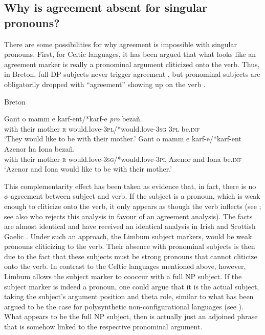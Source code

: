 \documentclass[output=paper]{langscibook}
\begin{document}
\subsection{Why is agreement absent for singular pronouns?}

There are some possibilities for why agreement is impossible with
singular pronouns.  First, for Celtic languages, it has been
argued that what looks like an agreement marker is really a pronominal
argument cliticized onto the verb. Thus, in Breton, full DP subjects
never trigger agreement , but pronominal subjects are
obligatorily dropped with ``agreement'' showing up on the verb
.

\ea Breton \citep[][1916]{jouitteau+rezac06}
\begin{xlist}
\ex \label{ex:johanneshein:bretona}
\gll Gant o mamm e karf-ent/*karf-e \textit{pro} beza\~n.\\
with their mother \textsc{r} would.love-\textsc{3pl}/*would.love-\textsc{3sg} \textsc{3pl} be.\textsc{inf}\\
\glt `They would like to be with their mother.'
\ex \label{ex:johanneshein:bretonb}
\gll Gant o mamm e karf-e/*karf-ent Azenor ha Iona beza\~n.\\
with their mother \textsc{r} would.love-\textsc{3sg}/*would.love-\textsc{3pl} Azenor and Iona be.\textsc{inf}\\
\glt `Azenor and Iona would like to be with their mother.'
\end{xlist}
\z
This complementarity effect has been taken as evidence that, in fact,
there is no $\phi$-agreement between subject and verb. If the subject
is a pronoun, which is weak enough to cliticize onto the verb, it only
appears as though the verb inflects (see \citealp{anderson82}; see
also \citealp{stump84} who rejects this analysis in favour of an
agreement analysis). The facts are almost identical and have received
an identical analysis in Irish
\citep{pranka83,doron88,ackema+neeleman03} and Scottish Gaelic
\citep{adger00}. Under such an approach, the Limbum subject markers,
would be weak pronouns cliticizing to the verb. Their absence with
pronominal subjects is then due to the fact that these subjects must
be strong pronouns that cannot cliticize onto the verb. In contrast to
the Celtic languages mentioned above, however, Limbum allows the
subject marker to cooccur with a full NP subject. If the subject
marker is indeed a pronoun, one could argue that it is the actual
subject, taking the subject's argument position and theta role,
similar to what has been argued to be the case for polysynthetic
non-configurational languages (see \citealp{jelinek84,baker96}). What
appears to be the full NP subject, then is actually just an adjoined
phrase that is somehow linked to the respective pronominal argument.
\end{document}
